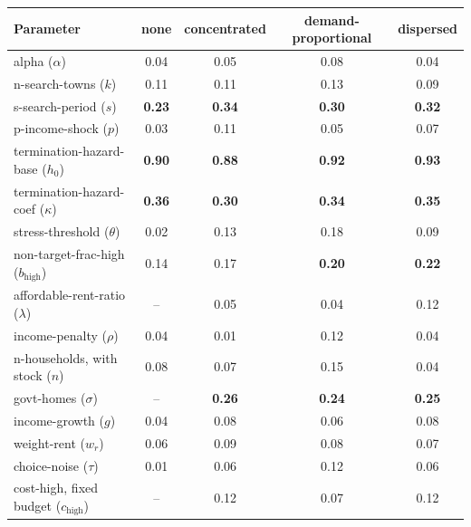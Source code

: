 \begin{tabular}{lcccc}
\toprule
Parameter & none & concentrated & demand-proportional & dispersed \\
\midrule
alpha ($\alpha$) & 0.04 & 0.05 & 0.08 & 0.04 \\
n-search-towns ($k$) & 0.11 & 0.11 & 0.13 & 0.09 \\
s-search-period ($s$) & \textbf{0.23} & \textbf{0.34} & \textbf{0.30} & \textbf{0.32} \\
p-income-shock ($p$) & 0.03 & 0.11 & 0.05 & 0.07 \\
termination-hazard-base ($h_0$) & \textbf{0.90} & \textbf{0.88} & \textbf{0.92} & \textbf{0.93} \\
termination-hazard-coef ($\kappa$) & \textbf{0.36} & \textbf{0.30} & \textbf{0.34} & \textbf{0.35} \\
stress-threshold ($\theta$) & 0.02 & 0.13 & 0.18 & 0.09 \\
non-target-frac-high ($b_{\mathrm{high}}$) & 0.14 & 0.17 & \textbf{0.20} & \textbf{0.22} \\
affordable-rent-ratio ($\lambda$) & -- & 0.05 & 0.04 & 0.12 \\
income-penalty ($\rho$) & 0.04 & 0.01 & 0.12 & 0.04 \\
n-households, with stock ($n$) & 0.08 & 0.07 & 0.15 & 0.04 \\
govt-homes ($\sigma$) & -- & \textbf{0.26} & \textbf{0.24} & \textbf{0.25} \\
income-growth ($g$) & 0.04 & 0.08 & 0.06 & 0.08 \\
weight-rent ($w_r$) & 0.06 & 0.09 & 0.08 & 0.07 \\
choice-noise ($\tau$) & 0.01 & 0.06 & 0.12 & 0.06 \\
cost-high, fixed budget ($c_{\mathrm{high}}$) & -- & 0.12 & 0.07 & 0.12 \\
\bottomrule
\end{tabular}
